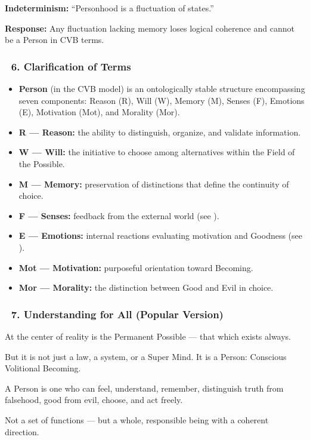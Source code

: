 \documentclass[12pt]{article}
\begin{document}
\bigskip

\textbf{Indeterminism:} ``Personhood is a fluctuation of states.''

\textbf{Response:} Any fluctuation lacking memory loses logical coherence and cannot be a Person in CVB terms.

\subsubsection*{🔹 6. Clarification of Terms}

\begin{itemize}
\item \textbf{Person} (in the CVB model) is an ontologically stable structure encompassing seven components: Reason (R), Will (W), Memory (M), Senses (F), Emotions (E), Motivation (Mot), and Morality (Mor).
\item \textbf{R — Reason:} the ability to distinguish, organize, and validate information.
\item \textbf{W — Will:} the initiative to choose among alternatives within the Field of the Possible.
\item \textbf{M — Memory:} preservation of distinctions that define the continuity of choice.
\item \textbf{F — Senses:} feedback from the external world (see \text{[10.1]}).
\item \textbf{E — Emotions:} internal reactions evaluating motivation and Goodness (see \text{[10.4]}).
\item \textbf{Mot — Motivation:} purposeful orientation toward Becoming.
\item \textbf{Mor — Morality:} the distinction between Good and Evil in choice.
\end{itemize}

\subsubsection*{🔹 7. Understanding for All (Popular Version)}

At the center of reality is the Permanent Possible — that which exists always.

But it is not just a law, a system, or a Super Mind. It is a Person: Conscious Volitional Becoming.

A Person is one who can feel, understand, remember, distinguish truth from falsehood, good from evil, choose, and act freely.

Not a set of functions — but a whole, responsible being with a coherent direction.
\end{document}
